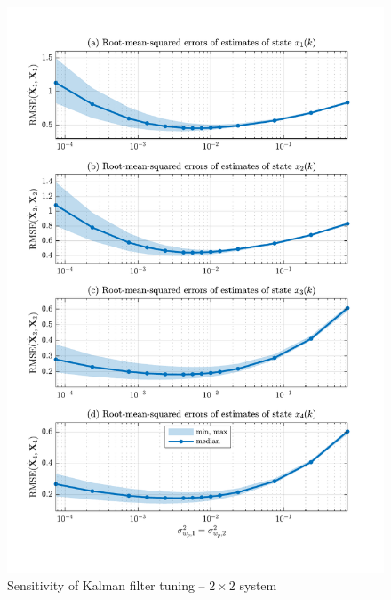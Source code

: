 \begin{figure}[htp]
	\centering
	\includegraphics[width=14cm]{images/rod_obs_sim2_3KF_Q_statplot.pdf}
	\caption{Sensitivity of Kalman filter tuning – $2\times2$ system}
	\label{fig:sim-sys-2x2-KF3-sensitivity}
\end{figure}


